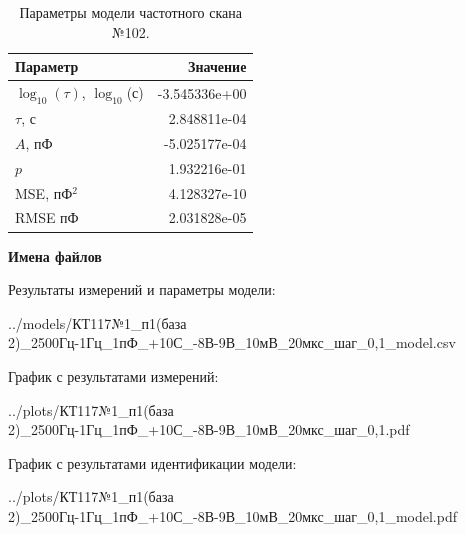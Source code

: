 \begin{table}[!ht]
    \centering
    \caption{Параметры модели частотного скана №102.}
    \begin{tabular}{|l|r|}
        \hline
        Параметр                                       & Значение                  \\ \hline
        $\log_{10}(\tau)$, $\log_{10}$(с)              & -3.545336e+00             \\ \hline
        $\tau$, с                                      & 2.848811e-04              \\ \hline
        $A$, пФ                                        & -5.025177e-04             \\ \hline
        $p$                                            & 1.932216e-01              \\ \hline
        MSE, пФ$^2$                                    & 4.128327e-10              \\ \hline
        RMSE пФ                                        & 2.031828e-05              \\ \hline
    \end{tabular}
    \label{table:frequency_scan_model_102}
\end{table}

\textbf{Имена файлов}

Результаты измерений и параметры модели:

\scriptsize../models/КТ117№1\_п1(база 2)\_2500Гц-1Гц\_1пФ\_+10С\_-8В-9В\_10мВ\_20мкс\_шаг\_0,1\_model.csv
\normalsize

График с результатами измерений:

\scriptsize../plots/КТ117№1\_п1(база 2)\_2500Гц-1Гц\_1пФ\_+10С\_-8В-9В\_10мВ\_20мкс\_шаг\_0,1.pdf
\normalsize

График с результатами идентификации модели:

\scriptsize../plots/КТ117№1\_п1(база 2)\_2500Гц-1Гц\_1пФ\_+10С\_-8В-9В\_10мВ\_20мкс\_шаг\_0,1\_model.pdf
\normalsize

